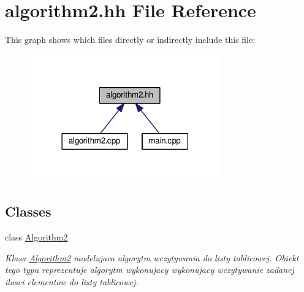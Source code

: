 \hypertarget{algorithm2_8hh}{\section{algorithm2.\-hh File Reference}
\label{algorithm2_8hh}
}
This graph shows which files directly or indirectly include this file\-:\nopagebreak
\begin{figure}[H]
\begin{center}
\leavevmode
\includegraphics[width=234pt]{algorithm2_8hh__dep__incl}
\end{center}
\end{figure}
\subsection*{Classes}
\begin{DoxyCompactItemize}
\item 
class \hyperlink{class_algorithm2}{Algorithm2}
\begin{DoxyCompactList}\small\item\em Klasa \hyperlink{class_algorithm2}{Algorithm2} modelujaca algorytm wczytywania do listy tablicowej. Obiekt tego typu reprezentuje algorytm wykonujacy wykonujacy wczytywanie zadanej ilosci elementow do listy tablicowej. \end{DoxyCompactList}\end{DoxyCompactItemize}
